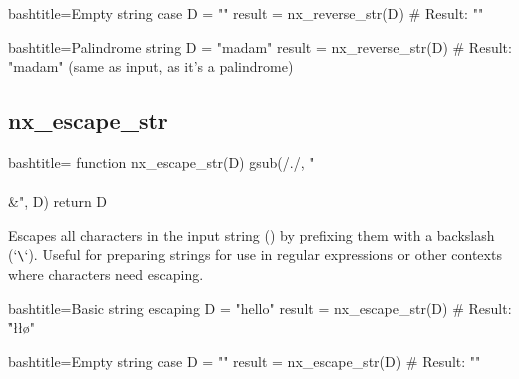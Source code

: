 \begin{NexCodeBox}{bash}{title={Empty string case}}
	D = ""
	result = nx_reverse_str(D)
	# Result: ""
\end{NexCodeBox}

\begin{NexCodeBox}{bash}{title={Palindrome string}}
	D = "madam"
	result = nx_reverse_str(D)
	# Result: "madam" (same as input, as it's a palindrome)
\end{NexCodeBox}

\newpage
\subsection{nx_escape_str}
\label{nx_escape_str}
\begin{NexCodeBox}{bash}{title={}}
function nx_escape_str(D) {
	gsub(/./, "\\\\&", D)
	return D
}
\end{NexCodeBox}


\begin{NexMainBox}
	\begin{NexMainBox}
		Escapes all characters in the input string () by prefixing them with a backslash (`\texttt{\textbackslash}`). Useful for preparing strings for use in regular expressions or other contexts where characters need escaping.
	\end{NexMainBox}
	\begin{NexMainBox}
		\begin{NexListDark}
		\end{NexListDark}
	\end{NexMainBox}
\end{NexMainBox}

\begin{NexCodeBox}{bash}{title={Basic string escaping}}
	D = "hello"
	result = nx_escape_str(D)
	# Result: "\h\e\l\l\o"
\end{NexCodeBox}


\begin{NexCodeBox}{bash}{title={Empty string case}}
	D = ""
	result = nx_escape_str(D)
	# Result: ""
\end{NexCodeBox}

